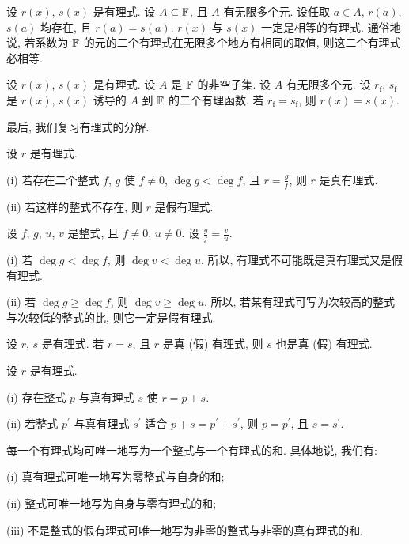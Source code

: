 \begin{proposition}
    设 $r(x)$, $s(x)$ 是有理式. 设 $A \subset \mathbb{F}$, 且 $A$ 有无限多个元. 设任取 $a \in A$, $r(a)$, $s(a)$ 均存在, 且 $r(a) = s(a)$. $r(x)$ 与 $s(x)$ 一定是相等的有理式. 通俗地说, 若系数为 $\mathbb{F}$ 的元的二个有理式在无限多个地方有相同的取值, 则这二个有理式必相等.
\end{proposition}

\begin{proposition}
    设 $r(x)$, $s(x)$ 是有理式. 设 $A$ 是 $\mathbb{F}$ 的非空子集. 设 $A$ 有无限多个元. 设 $r_{\mathrm{f}}$, $s_{\mathrm{f}}$ 是 $r(x)$, $s(x)$ 诱导的 $A$ 到 $\mathbb{F}$ 的二个有理函数. 若 $r_{\mathrm{f}} = s_{\mathrm{f}}$, 则 $r(x) = s(x)$.
\end{proposition}

最后, 我们复习有理式的分解.

\begin{definition}
    设 $r$ 是有理式.

    (i) 若存在二个整式 $f$, $g$ 使 $f \neq 0$, $\deg g < \deg f$, 且 $r = \frac{g}{f}$, 则 $r$ 是真有理式.

    (ii) 若这样的整式不存在, 则 $r$ 是假有理式.
\end{definition}

\begin{proposition}
    设 $f$, $g$, $u$, $v$ 是整式, 且 $f \neq 0$, $u \neq 0$. 设 $\frac{g}{f} = \frac{v}{u}$.

    (i) 若 $\deg g < \deg f$, 则 $\deg v < \deg u$. 所以, 有理式不可能既是真有理式又是假有理式.

    (ii) 若 $\deg g \geq \deg f$, 则 $\deg v \geq \deg u$. 所以, 若某有理式可写为次较高的整式与次较低的整式的比, 则它一定是假有理式.
\end{proposition}

\begin{proposition}
    设 $r$, $s$ 是有理式. 若 $r = s$, 且 $r$ 是真 (假) 有理式, 则 $s$ 也是真 (假) 有理式.
\end{proposition}

\begin{proposition}
    设 $r$ 是有理式.

    (i) 存在整式 $p$ 与真有理式 $s$ 使 $r = p + s$.

    (ii) 若整式 $p^{\prime}$ 与真有理式 $s^{\prime}$ 适合 $p + s = p^{\prime} + s^{\prime}$, 则 $p = p^{\prime}$, 且 $s = s^{\prime}$.
\end{proposition}

\begin{proposition}
    每一个有理式均可唯一地写为一个整式与一个有理式的和. 具体地说, 我们有:

    (i) 真有理式可唯一地写为零整式与自身的和;

    (ii) 整式可唯一地写为自身与零有理式的和;

    (iii) 不是整式的假有理式可唯一地写为非零的整式与非零的真有理式的和.
\end{proposition}

